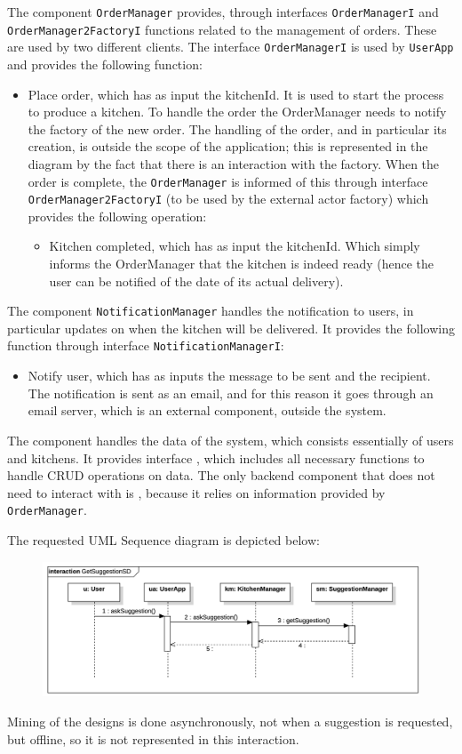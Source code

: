 The component \texttt{OrderManager} provides, through interfaces \texttt{OrderManagerI} and \texttt{OrderManager2FactoryI} functions related to the management of orders. 
These are used by two different clients. 
The interface \texttt{OrderManagerI} is used by \texttt{UserApp} and provides the following function: 
\begin{itemize}
\item Place order, which has as input the kitchenId.
    It is used to start the process to produce a kitchen. 
    To handle the order the OrderManager needs to notify the factory of the new order. 
    The handling of the order, and in particular its creation, is outside the scope of the  application; this is represented in the diagram by the fact that there is an interaction with the factory. 
    When the order is complete, the \texttt{OrderManager} is informed of this through interface \texttt{OrderManager2FactoryI} (to be used by the external actor factory) which provides the following operation:
    \begin{itemize}
        \item Kitchen completed, which has as input the kitchenId. 
            Which simply informs the OrderManager that the kitchen is indeed ready (hence the user can be notified of the date of its actual delivery).
    \end{itemize}
\end{itemize}

The component \texttt{NotificationManager} handles the notification to users, in particular updates on when the kitchen will be delivered. 
It provides the following function through interface \texttt{NotificationManagerI}:
\begin{itemize}
    \item Notify user, which has as inputs the message to be sent and the recipient. 
        The notification is sent as an email, and for this reason it goes through an email server, which is an external component, outside the system.
\end{itemize}

The component  handles the data of the system, which consists essentially of users and kitchens. 
It provides interface , which includes all necessary functions to handle CRUD operations on data.
The only backend component that does not need to interact with  is , because it relies on information provided by \texttt{OrderManager}.

The requested UML Sequence diagram is depicted below: 
\begin{figure}[H]
    \centering
    \includegraphics[width=0.9\linewidth]{images/sd2.png}
\end{figure}
Mining of the designs is done asynchronously, not when a suggestion is requested, but offline, so it is not represented in this interaction.